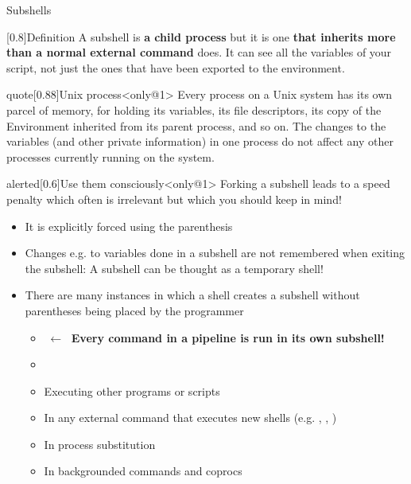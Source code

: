 \begin{frame}{Subshells}
    \vspace{-8mm}
    \begin{overlayarea}{\textwidth}{0.7\textheight}
        \begin{varblock}{}[0.8\textwidth]{Definition}
            A subshell is \textbf{a child process} but it is one \textbf{that inherits more than a normal external command} does.
            It can see all the variables of your script, not just the ones that have been exported to the environment.
        \end{varblock}
        \begin{varblock}{quote}[0.88\textwidth]{Unix process}<only@1>
            Every process on a Unix system has its own parcel of memory, for holding its variables, its file descriptors, its copy of the Environment inherited from its parent process, and so on.
            The changes to the variables (and other private information) in one process do not affect any other processes currently running on the system.
        \end{varblock}
        \begin{varblock}{alerted}[0.6\textwidth]{Use them consciously}<only@1>
            Forking a subshell leads to a speed penalty which often is irrelevant but which you should keep in mind!
        \end{varblock}
        \begin{itemize}[<2>]
            \item It is explicitly forced using the parenthesis \PB{\texttt{(\ldots)}}
            \item Changes e.g. to variables done in a subshell are not remembered when exiting the subshell: A subshell can be thought as a temporary shell!
            \item There are many instances in which a shell creates a subshell without parentheses being placed by the programmer
                  \begin{itemize}
                      \item {} $\;\longleftarrow\;$ \alert{\textbf{Every command in a pipeline is run in its own subshell!}}
                      \item {}
                      \item Executing other programs or scripts
                      \item In any external command that executes new shells (e.g. , , )
                      \item In process substitution
                      \item In backgrounded commands and coprocs
                  \end{itemize}
        \end{itemize}
    \end{overlayarea}
\end{frame}
